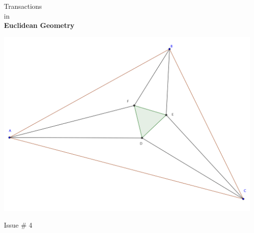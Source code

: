 \documentclass{report}
\begin{document}
\thispagestyle{empty}
\begin{center}
{\Huge Transactions\\ in\\ \textbf{Euclidean Geometry}}

\vspace{1in}

\includegraphics[width=1.1\textwidth]{cover-image.png}



\vfill
{\Huge Issue \# 4}
\end{center}
\end{document}
